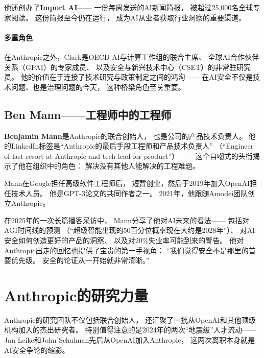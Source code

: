 他还创办了\textbf{Import AI}——
一份每周发送的AI新闻简报，
被超过25,000名全球专家阅读。
这份简报至今仍在运行，
成为AI从业者获取行业洞察的重要渠道。

\paragraph{多重角色}
在Anthropic之外，Clark是OECD AI与计算工作组的联合主席、
全球AI合作伙伴关系（GPAI）的专家成员、
以及安全与新兴技术中心（CSET）的非常驻研究员。
他的价值在于连接了技术研究与政策制定之间的鸿沟——
在AI安全不仅是技术问题、也是治理问题的今天，
这种桥梁角色至关重要。

\subsection{Ben Mann——工程师中的工程师}
\label{subsec:mann}

\textbf{Benjamin Mann}是Anthropic的联合创始人，
也是公司的产品技术负责人。
他的LinkedIn标签是``Anthropic的最后手段工程师和产品技术负责人''
（``Engineer of last resort at Anthropic and tech lead for product''）——
这个自嘲式的头衔揭示了他在组织中的角色：
解决没有其他人能解决的工程难题。

Mann在Google担任高级软件工程师后，
短暂创业，然后于2019年加入OpenAI担任技术人员。
他是GPT-3论文的共同作者之一。
2021年，他跟随Amodei团队创立Anthropic。

在2025年的一次长篇播客采访中，
Mann分享了他对AI未来的看法——
包括对AGI时间线的预测
（``超级智能出现的50百分位概率现在大约是2028年''）、
对AI安全如何创造更好的产品的洞察、
以及对20\%失业率可能到来的警告。
他对Anthropic出走的回忆也提供了宝贵的第一手视角：
``我们觉得安全不是那里的首要优先级。
安全的论证从一开始就非常清晰。''


\section{Anthropic的研究力量}
\label{sec:anthropic-research}

Anthropic的研究团队不仅包括联合创始人，
还汇聚了一批从OpenAI和其他顶级机构加入的杰出研究者。
特别值得注意的是2024年的两次``地震级''人才流动——
Jan Leike和John Schulman先后从OpenAI加入Anthropic，
这两次离职本身就是AI安全争论的缩影。

